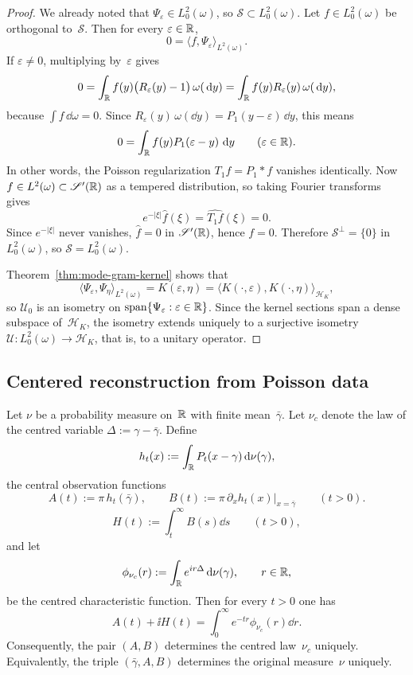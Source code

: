 \begin{proof}
We already noted that $\Psi_\varepsilon\in L^2_0(\omega)$, so
$\mathcal S\subset L^2_0(\omega)$.  Let
$f\in L^2_0(\omega)$ be orthogonal to~$\mathcal S$.  Then for every
$\varepsilon\in\mathbb{R}$,
\[
0=\langle f,\Psi_\varepsilon\rangle_{L^2(\omega)}.
\]
If $\varepsilon\neq 0$, multiplying by~$\varepsilon$ gives
\[
0=\int_{\mathbb{R}}f(y)\bigl(R_\varepsilon(y)-1\bigr)\,\omega(\,\mathrm{d} y)
=\int_{\mathbb{R}}f(y)R_\varepsilon(y)\,\omega(\,\mathrm{d} y),
\]
because $\int f\,\dd\omega=0$.  Since
$R_\varepsilon(y)\,\omega(\dd y)=P_1(y-\varepsilon)\,\dd y$, this means
\[
0=\int_{\mathbb{R}}f(y)P_1(\varepsilon-y)\,\,\mathrm{d} y
\qquad(\varepsilon\in\mathbb{R}).
\]
In other words, the Poisson regularization $T_1f=P_1*f$ vanishes
identically.  Now $f\in L^2(\omega)\subset\mathscr S'(\mathbb{R})$ as a tempered
distribution, so taking Fourier transforms gives
\[
e^{-|\xi|}\widehat f(\xi)=\widehat{T_1f}(\xi)=0.
\]
Since $e^{-|\xi|}$ never vanishes, $\widehat f=0$ in $\mathscr S'(\mathbb{R})$,
hence $f=0$.  Therefore $\mathcal S^\perp=\{0\}$ in $L^2_0(\omega)$, so
$\mathcal S=L^2_0(\omega)$.

Theorem~\ref{thm:mode-gram-kernel} shows that
\[
\langle \Psi_\varepsilon,\Psi_\eta\rangle_{L^2(\omega)}
=K(\varepsilon,\eta)
=\langle K(\cdot,\varepsilon),K(\cdot,\eta)\rangle_{\mathcal H_K},
\]
so $\mathcal U_0$ is an isometry on
$\operatorname{span}\{\Psi_\varepsilon:\varepsilon\in\mathbb{R}\}$.  Since the
kernel sections span a dense subspace of~$\mathcal H_K$, the isometry
extends uniquely to a surjective isometry
$\mathcal U:L^2_0(\omega)\to\mathcal H_K$, that is, to a unitary
operator.
\end{proof}

\subsection{Centered reconstruction from Poisson data}

\begin{theorem}%
\label{thm:poisson-central-two-channel}
Let $\nu$ be a probability measure on~$\mathbb{R}$ with finite mean~$\bar\gamma$.
Let $\nu_c$ denote the law of the centred variable
$\Delta:=\gamma-\bar\gamma$.  Define
\[
h_t(x):=\int_{\mathbb{R}}P_t(x-\gamma)\,\mathrm{d}\nu(\gamma),
\]
the central observation functions
\[
A(t):=\pi\,h_t(\bar\gamma),
\qquad
B(t):=\pi\,\partial_x h_t(x)\big|_{x=\bar\gamma}
\qquad(t>0).
\]
\[
H(t):=\int_t^\infty B(s)\dd s
\qquad(t>0),
\]
and let
\[
\phi_{\nu_c}(r):=\int_{\mathbb{R}}e^{ir\Delta}\,\mathrm{d}\nu(\gamma),
\qquad r\in\mathbb{R},
\]
be the centred characteristic function.  Then for every $t>0$ one has
\begin{equation}\label{eq:poisson-laplace-reconstruction}
A(t)+\ii H(t)
=\int_0^\infty e^{-tr}\phi_{\nu_c}(r)\dd r.
\end{equation}
Consequently, the pair $(A,B)$ determines the centred law~$\nu_c$
uniquely.  Equivalently, the triple $(\bar\gamma,A,B)$ determines the
original measure~$\nu$ uniquely.
\end{theorem}

